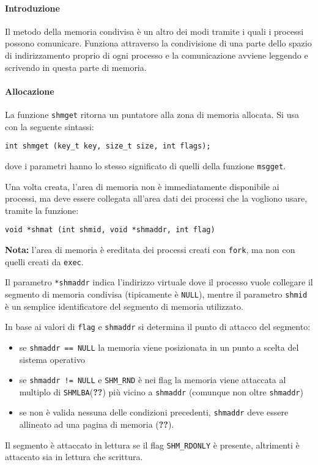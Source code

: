 \documentclass[a4paper, 10pt]{article}
\begin{document}
\paragraph{Introduzione}
Il metodo della memoria condivisa è un altro dei modi tramite i quali i processi possono comunicare. Funziona attraverso la condivisione di una parte dello spazio di indirizzamento proprio di ogni processo e la comunicazione avviene leggendo e scrivendo in questa parte di memoria.

\paragraph{Allocazione}
La funzione \verb|shmget| ritorna un puntatore alla zona di memoria allocata. Si usa con la seguente sintassi:
\begin{verbatim}
int shmget (key_t key, size_t size, int flags);
\end{verbatim}
dove i parametri hanno lo stesso significato di quelli della funzione \verb|msgget|.

Una volta creata, l'area di memoria non è immediatamente disponibile ai processi, ma deve essere collegata all'area dati dei processi che la vogliono usare, tramite la funzione:
\begin{verbatim}
void *shmat (int shmid, void *shmaddr, int flag)
\end{verbatim}
\textbf{Nota:} l'area di memoria è ereditata dei processi creati con \verb|fork|, ma non con quelli creati da \verb|exec|.

Il parametro \verb|*shmaddr| indica l'indirizzo virtuale dove il processo vuole collegare il segmento di memoria condivisa (tipicamente è \verb|NULL|), mentre il parametro \verb|shmid| è un semplice identificatore del segmento di memoria utilizzato.

In base ai valori di \verb|flag| e \verb|shmaddr| si determina il punto di attacco del segmento:
\begin{itemize}
\item se \verb|shmaddr == NULL| la memoria viene posizionata in un punto a scelta del sistema operativo
\item se \verb|shmaddr != NULL| e \verb|SHM_RND| è nei flag la memoria  viene attaccata al multiplo di \verb|SHMLBA|(\textbf{??}) più vicino a \verb|shmaddr| (comunque non oltre \verb|shmaddr|)
\item se non è valida nessuna delle condizioni precedenti, \verb|shmaddr| deve essere allineato ad una pagina di memoria (\textbf{??}).
\end{itemize}
Il segmento è attaccato in lettura se il flag \verb|SHM_RDONLY| è presente, altrimenti è attaccato sia in lettura che scrittura.
\end{document}
